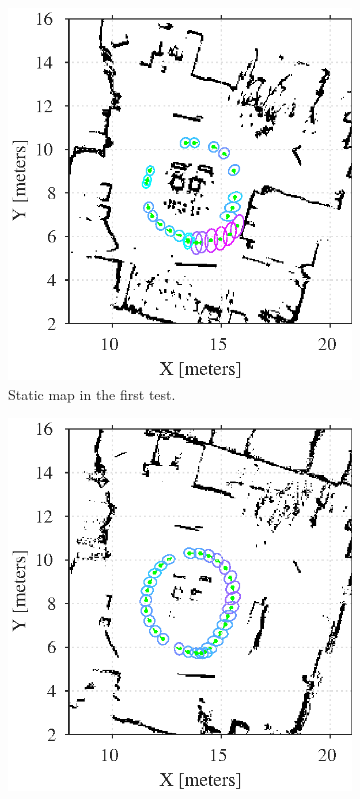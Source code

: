 \begin{figure}[htbp]
	\centering
	\begin{subfigure}[t]{0.45\linewidth}
		\includegraphics[width=\linewidth]{chapters/evaluation/figures/localization_static_map1}
       	\caption{Static map in the first test.}
        \label{fig:amcl_covariance_static1}
	\end{subfigure}
    \hspace{2mm}
   	\begin{subfigure}[t]{0.45\linewidth}
        \includegraphics[width=\linewidth]{chapters/evaluation/figures/localization_dynamic_map1}

\end{subfigure}
\end{figure}
